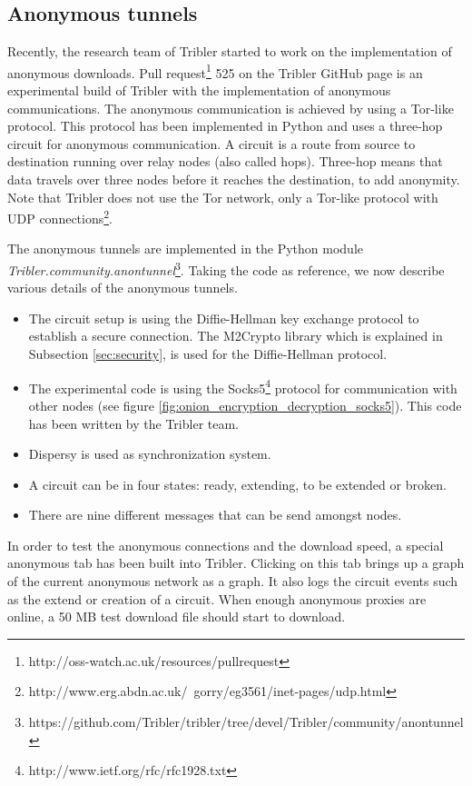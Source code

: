 	\subsection{Anonymous tunnels}
		\label{sec:anonymoustunnels}
			Recently, the research team of Tribler started to work on the implementation of anonymous downloads. Pull request\footnote{http://oss-watch.ac.uk/resources/pullrequest} 525 on the Tribler GitHub page \cite{pullrequest525} is an experimental build of Tribler with the implementation of anonymous communications. The anonymous communication is achieved by using a Tor-like protocol. This protocol has been implemented in Python and uses a three-hop circuit for anonymous communication. A circuit is a route from source to destination running over relay nodes (also called hops). Three-hop means that data travels over three nodes before it reaches the destination, to add anonymity. Note that Tribler does not use the Tor network, only a Tor-like protocol with UDP connections\footnote{http://www.erg.abdn.ac.uk/~gorry/eg3561/inet-pages/udp.html}.
			
			The anonymous tunnels are implemented in the Python module \emph{Tribler.community.anontunnel}\footnote{https://github.com/Tribler/tribler/tree/devel/Tribler/community/anontunnel}. Taking the code as reference, we now describe various details of the anonymous tunnels.
			
			\begin{itemize} 
				\item The circuit setup is using the Diffie-Hellman key exchange protocol to establish a secure connection. The M2Crypto library which is explained in Subsection \ref{sec:security}, is used for the Diffie-Hellman protocol.
				\item The experimental code is using the Socks5\footnote{http://www.ietf.org/rfc/rfc1928.txt} protocol for communication with other nodes (see figure \ref{fig:onion_encryption_decryption_socks5}). This code has been written by the Tribler team.
				\item Dispersy is used as synchronization system. 
				\item A circuit can be in four states: ready, extending, to be extended or broken.
				\item There are nine different messages that can be send amongst nodes.
			\end{itemize}
			
			In order to test the anonymous connections and the download speed, a special anonymous tab has been built into Tribler. Clicking on this tab brings up a graph of the current anonymous network as a graph. It also logs the circuit events such as the extend or creation of a circuit. When enough anonymous proxies are online, a 50 MB test download file should start to download.
			
